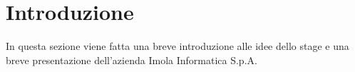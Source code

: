 
\chapter{Introduzione}\label{ch:introduzione}

In questa sezione viene fatta una breve introduzione alle idee dello stage e una breve presentazione dell'azienda Imola Informatica S.p.A.
%
%





